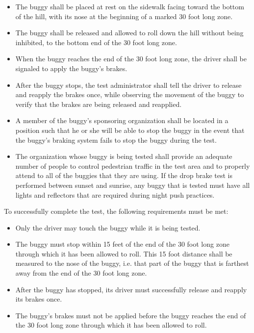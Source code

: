 	\begin{itemize}

		\item
		The buggy shall be placed at rest on the sidewalk facing toward the bottom of
		the hill, with its nose at the beginning of a marked 30 foot long zone.

		\item
		The buggy shall be released and allowed to roll down the hill without being
		inhibited, to the bottom end of the 30 foot long zone.

		\item
		When the buggy reaches the end of the 30 foot long zone, the driver shall be
		signaled to apply the buggy's brakes.

		\item
		After the buggy stops, the test administrator shall tell the driver to release
		and reapply the brakes once, while observing the movement of the buggy to
		verify that the brakes are being released and reapplied.

		\item
		A member of the buggy's sponsoring organization shall be located in a position
		such that he or she will be able to stop the buggy in the event that the
		buggy's braking system fails to stop the buggy during the test.

		\item
		The organization whose buggy is being tested shall provide an adequate number
		of people to control pedestrian traffic in the test area and to properly attend
		to all of the buggies that they are using. If the drop brake test is performed
		between sunset and sunrise, any buggy that is tested must have all lights and
		reflectors that are required during night push practices.

	\end{itemize}

	\noindent To successfully complete the test, the following requirements must be met:

	\begin{itemize}

		\item
		Only the driver may touch the buggy while it is being tested.

		\item
		The buggy must stop within 15 feet of the end of the 30 foot long zone through
		which it has been allowed to roll. This 15 foot distance shall be measured to
		the nose of the buggy, i.e. that part of the buggy that is farthest away from
		the end of the 30 foot long zone.

		\item
		After the buggy has stopped, its driver must successfully release and reapply
		its brakes once.

		\item
		The buggy's brakes must not be applied before the buggy reaches the end of the
		30 foot long zone through which it has been allowed to roll.

	\end{itemize}

